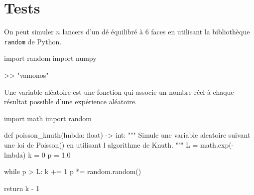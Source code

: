 \section{Tests}

\begin{examplebox}
On peut simuler $n$ lancers d'un dé équilibré à 6 faces en utilisant la bibliothèque \texttt{random} de Python.

\begin{codecell}
import random
import numpy
\end{codecell}

\begin{outputcell}
>> "vamonos"
\end{outputcell}

\end{examplebox}

\begin{definitionbox}
Une variable aléatoire est une fonction qui associe un nombre réel à chaque résultat possible d'une expérience aléatoire.
\end{definitionbox}

\begin{codecell}
import math
import random

def poisson_knuth(lmbda: float) -> int:
  """
  Simule une variable aleatoire suivant une loi de Poisson()
  en utilisant l algorithme de Knuth.
  """
  L = math.exp(-lmbda)
  k = 0
  p = 1.0

  while p > L:
  k += 1
  p *= random.random()

  return k - 1
\end{codecell}
